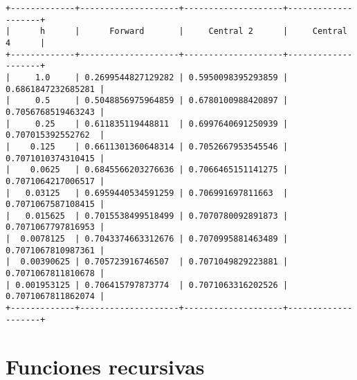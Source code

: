 \begin{code}
\begin{Shaded}
\begin{Highlighting}[]
\OperatorTok{=}\NormalTok{ [(}\OperatorTok{/}\NormalTok{)}\OperatorTok{**} \NormalTok{(}\NormalTok{)]}
\OperatorTok{=}\OperatorTok{/}

\OperatorTok{=}\OperatorTok{=}\NormalTok{[}\NormalTok{, }\NormalTok{, }\NormalTok{, }\NormalTok{])}
\OperatorTok{=}
\OperatorTok{=}
\OperatorTok{=}

\end{Highlighting}
\end{Shaded}

\begin{verbatim}
+-------------+--------------------+--------------------+--------------------+
|      h      |      Forward       |     Central 2      |     Central 4      |
+-------------+--------------------+--------------------+--------------------+
|     1.0     | 0.2699544827129282 | 0.5950098395293859 | 0.6861847232685281 |
|     0.5     | 0.5048856975964859 | 0.6780100988420897 | 0.7056768519463243 |
|     0.25    | 0.611835119448811  | 0.6997640691250939 | 0.707015392552762  |
|    0.125    | 0.6611301360648314 | 0.7052667953545546 | 0.7071010374310415 |
|    0.0625   | 0.6845566203276636 | 0.7066465151141275 | 0.7071064217006517 |
|   0.03125   | 0.6959440534591259 | 0.706991697811663  | 0.7071067587108415 |
|   0.015625  | 0.7015538499518499 | 0.7070780092891873 | 0.7071067797816953 |
|  0.0078125  | 0.7043374663312676 | 0.7070995881463489 | 0.7071067810987361 |
|  0.00390625 | 0.705723916746507  | 0.7071049829223881 | 0.7071067811810678 |
| 0.001953125 | 0.706415797873774  | 0.7071063316202526 | 0.7071067811862074 |
+-------------+--------------------+--------------------+--------------------+
\end{verbatim}
\end{code}  

\section{Funciones recursivas}

